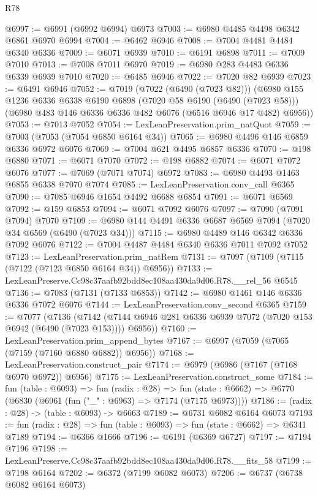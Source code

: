 \begin{lexlean}{R78}
\begin{coremodule}
@6997 := @6991 (@6992 @6994) @6973
@7003 := @6980 @4485 @4498 @6342 @6861 @6970 @6994
@7004 := @6462 @6946
@7008 := @7004 @4481 @4484 @6340 @6336
@7009 := @6071 @6939
@7010 := @6191 @6898
@7011 := @7009 @7010
@7013 := @7008 @7011 @6970
@7019 := @6980 @283 @4483 @6336 @6339 @6939 @7010
@7020 := @6485 @6946
@7022 := @7020 @82 @6939
@7023 := @6491 @6946
@7052 := @7019
    (@7022 (@6490 (@7023 @82)))
    (@6980
      @155
      @1236
      @6336
      @6338
      @6190
      @6898
      (@7020 @58 @6190 (@6490 (@7023 @58)))
      (@6980 @483 @146 @6336 @6336 @482 @6076 (@6516 @6946 @17 @482) @6956))
@7053 := @7013 @7052
@7054 := LexLeanPreservation.prim_natQuot
@7059 := @7003 (@7053 (@7054 @6850 @6164 @34))
@7065 := @6980 @4496 @146 @6859 @6336 @6972 @6076
@7069 := @7004 @621 @4495 @6857 @6336
@7070 := @198 @6880
@7071 := @6071 @7070
@7072 := @198 @6882
@7074 := @6071 @7072 @6076
@7077 := @7069 (@7071 @7074) @6972
@7083 := @6980 @4493 @1463 @6855 @6338 @7070 @7074
@7085 := LexLeanPreservation.conv_call @6365
@7090 := @7085 @6946 @1654 @4492 @6688 @6854
@7091 := @6071 @6569
@7092 := @159 @6853
@7094 := @6071 @7092 @6076
@7097 := @7090 (@7091 @7094) @7070
@7109 := @6980 @144 @4491 @6336 @6687 @6569 @7094 (@7020 @34 @6569 (@6490 (@7023 @34)))
@7115 := @6980 @4489 @146 @6342 @6336 @7092 @6076
@7122 := @7004 @4487 @4484 @6340 @6336 @7011 @7092 @7052
@7123 := LexLeanPreservation.prim_natRem
@7131 := @7097 (@7109 (@7115 (@7122 (@7123 @6850 @6164 @34)) @6956))
@7133 := LexLeanPreserve.Cc98c37aafb92bdd8ec108aa430da9d06.R78.__rel_56 @6545
@7136 := @7083 (@7131 (@7133 @6853))
@7142 := @6980 @1461 @146 @6336 @6336 @7072 @6076
@7144 := LexLeanPreservation.conv_second @6365
@7159 := @7077
    (@7136
      (@7142 (@7144 @6946 @281 @6336 @6939 @7072 (@7020 @153 @6942 (@6490 (@7023 @153)))) @6956))
@7160 := LexLeanPreservation.prim_append_bytes
@7167 := @6997 (@7059 (@7065 (@7159 (@7160 @6880 @6882)) @6956))
@7168 := LexLeanPreservation.construct_pair
@7174 := @6979 (@6986 (@7167 (@7168 @6970 @6972)) @6956)
@7175 := LexLeanPreservation.construct_some
@7184 := fun (table : @6093) =>
  fun (radix : @28) =>
  fun (state : @6662) => @6770 (@6830 (@6961 (fun ("_" : @6963) => @7174 (@7175 @6973))))
@7186 := (radix : @28) -> (table : @6093) -> @6663
@7189 := @6731 @6082 @6164 @6073
@7193 := fun (radix : @28) => fun (table : @6093) => fun (state : @6662) => @6341 @7189
@7194 := @6366 @1666
@7196 := @6191 (@6369 @6727)
@7197 := @7194 @7196
@7198 := LexLeanPreserve.Cc98c37aafb92bdd8ec108aa430da9d06.R78.__fits_58
@7199 := @7198 @6164
@7202 := @6372 (@7199 @6082 @6073)
@7206 := @6737 (@6738 @6082 @6164 @6073)

\end{coremodule}
\end{lexlean}
